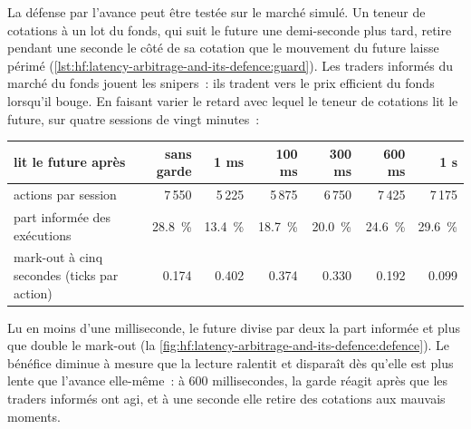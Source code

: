 La défense par l'avance peut être testée sur le marché simulé. Un teneur de cotations à un lot du fonds, qui suit le future une demi-seconde plus tard, retire pendant une
seconde le côté de sa cotation que le mouvement du future laisse périmé (\cref{lst:hf:latency-arbitrage-and-its-defence:guard}). Les traders informés du
marché du fonds jouent les snipers~: ils tradent vers le prix efficient du fonds lorsqu'il bouge. En faisant varier le retard avec lequel le teneur de cotations lit le future, sur
quatre sessions de vingt minutes~:

\begin{center}
\small
\begin{tabular}{@{}lrrrrrr@{}}
\toprule
lit le future après & sans garde & 1 ms & 100 ms & 300 ms & 600 ms & 1 s\\
\midrule
actions par session & 7\,550 & 5\,225 & 5\,875 & 6\,750 & 7\,425 & 7\,175\\
part informée des exécutions & 28.8~\% & 13.4~\% & 18.7~\% & 20.0~\% & 24.6~\% & 29.6~\%\\
mark-out à cinq secondes (ticks par action) & 0.174 & 0.402 & 0.374 & 0.330 & 0.192 & 0.099\\
\bottomrule
\end{tabular}
\end{center}

Lu en moins d'une milliseconde, le future divise par deux la part informée et plus que double le mark-out
(la \cref{fig:hf:latency-arbitrage-and-its-defence:defence}). Le bénéfice diminue à mesure que la lecture ralentit et disparaît dès qu'elle est plus lente que l'avance
elle-même~: à 600 millisecondes, la garde réagit après que les traders informés ont agi, et à une seconde elle retire des cotations aux mauvais moments.


